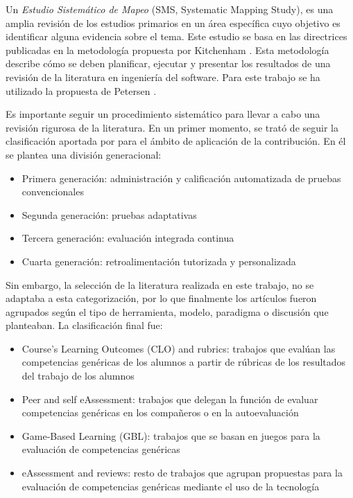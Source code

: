 
Un \emph{Estudio Sistemático de Mapeo} (SMS, Systematic Mapping Study), es una amplia revisión de los estudios primarios en un área específica cuyo objetivo es identificar alguna evidencia sobre el tema. Este estudio se basa en las directrices publicadas en la metodología propuesta por Kitchenham \cite{Kitchenham:2010}. Esta metodología describe cómo se deben planificar, ejecutar y presentar los resultados de una revisión de la literatura en ingeniería del software. Para este trabajo se ha utilizado la propuesta de Petersen \cite{Petersen:2008}.

Es importante seguir un procedimiento sistemático para llevar a cabo una revisión rigurosa de la literatura. En un primer momento, se trató de seguir la clasificación aportada por \cite{Redecker:2012} para el ámbito de aplicación de la contribución. En él se plantea una división generacional:
\begin{itemize}
\item Primera generación: administración y calificación automatizada de pruebas convencionales
\item Segunda generación: pruebas adaptativas
\item Tercera generación: evaluación integrada continua
\item Cuarta generación: retroalimentación tutorizada y personalizada
\end{itemize}
Sin embargo, la selección de la literatura realizada en este trabajo, no se adaptaba a esta categorización, por lo que finalmente los artículos fueron agrupados según el tipo de herramienta, modelo, paradigma o discusión que planteaban. La clasificación final fue:
\begin{itemize}
\item Course’s Learning Outcomes (CLO) and rubrics: trabajos que evalúan las competencias genéricas de los alumnos a partir de rúbricas de los resultados del trabajo de los alumnos
\item Peer and self eAssessment: trabajos que delegan la función de evaluar competencias genéricas en los compañeros o en la autoevaluación
\item Game-Based Learning (GBL): trabajos que se basan en juegos para la evaluación de competencias genéricas
\item eAssessment and reviews: resto de trabajos que agrupan propuestas para la evaluación de competencias genéricas mediante el uso de la tecnología 
\end{itemize}

